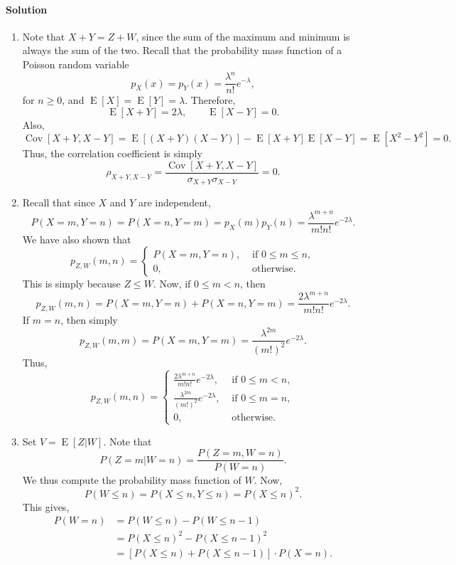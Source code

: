 \documentclass[10pt]{article}
\newcounter{prob}
\def\solution{\paragraph{Solution}}
\newcommand\op[1]{\operatorname{#1}}
\newcommand\E[1]{\op{E}[#1]}
\newcommand\CV[1]{\op{Cov}[#1]}
\begin{document}
        \solution \begin{enumerate}
            \itemsep0em
            \item Note that $X + Y = Z + W$, since the sum of the maximum and
            minimum is always the sum of the two. Recall that the probability mass
            function of a Poisson random variable \[
                p_X(x) = p_Y(x) = \frac{\lambda^n}{n!}e^{-\lambda},
            \] for $n \geq 0$, and $\E{X} = \E{Y} = \lambda$. Therefore, \[
                \E{X + Y} = 2\lambda, \qquad \E{X - Y} = 0.
            \] Also, \[
                \CV{X + Y, X - Y} = \E{(X + Y)(X - Y)} - \E{X + Y}\E{X - Y} = \E{X^2
                - Y^2} = 0.
            \] Thus, the correlation coefficient is simply \[
                \rho_{X + Y, X - Y} = \frac{\CV{X + Y, X - Y}}{\sigma_{X + Y}
                \sigma_{X - Y}} = 0.
            \] 
            \item Recall that since $X$ and $Y$ are independent, \[
                P(X = m, Y = n) = P(X = n, Y = m) = p_X(m) p_Y(n) = \frac{\lambda^{m
                + n}}{m!n!}e^{-2\lambda}.
            \] We have also shown that \[
                p_{Z, W}(m, n) = \begin{cases}
                    P(X = m, Y = n), &\text{ if } 0 \leq m \leq n, \\
                    0, &\text{ otherwise}.
                \end{cases}
            \] This is simply because $Z \leq W$. Now, if $0 \leq m < n$, then \[
                p_{Z, W}(m, n) = P(X = m, Y = n) + P(X = n, Y = m) =
                \frac{2\lambda^{m + n}}{m!n!}e^{-2\lambda}.
            \] If $m = n$, then simply \[
                p_{Z, W}(m, m) = P(X = m, Y = m) =
                \frac{\lambda^{2m}}{(m!)^2}e^{-2\lambda}.
            \] Thus, \[
                p_{Z, W}(m, n) = \begin{cases}
                    \frac{2\lambda^{m + n}}{m!n!}e^{-2\lambda}, &\text{ if } 0 \leq
                    m < n, \\
                    \frac{\lambda^{2m}}{(m!)^2}e^{-2\lambda}, &\text{ if } 0 \leq m
                    = n, \\
                    0, &\text{ otherwise}.
                \end{cases}
            \]  

            \item Set $V = \E{Z | W}$. Note that \[
                P(Z = m | W = n) = \frac{P(Z = m, W = n)}{P(W = n)}.
            \] We thus compute the probability mass function of $W$. Now, \[
                P(W \leq n) = P(X \leq n, Y \leq n) = P(X \leq n)^2.
            \] This gives, \begin{align*}
                P(W = n) &= P(W \leq n) - P(W \leq n - 1) \\
                &= P(X \leq n)^2 - P(X \leq n - 1)^2 \\ 
                &= \left[P(X \leq n) + P(X \leq n - 1)\right]\cdot P(X = n).
            \end{align*}
        \end{enumerate}
\end{document}
